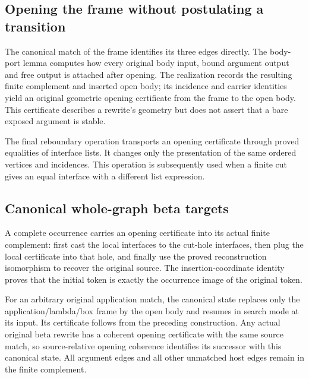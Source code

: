 \subsection{Opening the frame without postulating a transition}
The canonical match of the frame identifies its three edges directly. The body-port lemma computes how every original body input, bound argument output and free output is attached after opening. The realization records the resulting finite complement and inserted open body; its incidence and carrier identities yield an original geometric opening certificate from the frame to the open body. This certificate describes a rewrite's geometry but does not assert that a bare exposed argument is stable.

The final reboundary operation transports an opening certificate through proved equalities of interface lists. It changes only the presentation of the same ordered vertices and incidences. This operation is subsequently used when a finite cut gives an equal interface with a different list expression.
\par{}
\par{}

\subsection{Canonical whole-graph beta targets}
A complete occurrence carries an opening certificate into its actual finite complement: first cast the local interfaces to the cut-hole interfaces, then plug the local certificate into that hole, and finally use the proved reconstruction isomorphism to recover the original source. The insertion-coordinate identity proves that the initial token is exactly the occurrence image of the original token.

For an arbitrary original application match, the canonical state replaces only the application/lambda/box frame by the open body and resumes in search mode at its input. Its certificate follows from the preceding construction. Any actual original beta rewrite has a coherent opening certificate with the same source match, so source-relative opening coherence identifies its successor with this canonical state. All argument edges and all other unmatched host edges remain in the finite complement.
\par{}

